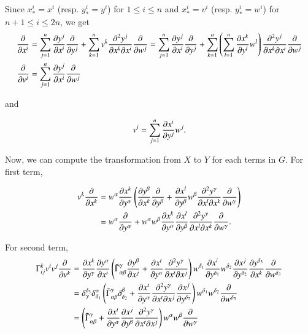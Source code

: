 \documentclass[a4paper, 12pt]{article}
\theoremstyle{Mydefinition}
\theoremstyle{Mytheorem}
\begin{document}
Since $x_*^i = x^i$ (resp. $y_*^i = y^i$) for $1\leq i\leq n$ and $x_*^i = v^i$ (resp. $y_*^i = w^i$) for $n+1\leq i\leq 2n$, we get
\begin{equation*}
\begin{split}
    \pdv{x^i} &= \sum_{j=1}^n \pdv{y^j}{x^i}\pdv{y^j} + \sum_{k=1}^n v^k \frac{\partial^2 y^j}{\partial x^k \partial x^i}\pdv{w^j} = \sum_{j=1}^n \pdv{y^j}{x^i}\pdv{y^j} + \sum_{k=1}^n \left(\sum_{l=1}^n \pdv{x^k}{y^l}w^l\right) \frac{\partial^2 y^j}{\partial x^k \partial x^i}\pdv{w^j}\\
     \pdv{v^i} &= \sum_{j=1}^n \pdv{y^j}{x^i}\pdv{w^j}
\end{split}
\end{equation*}

and

\begin{equation*}
    v^i = \sum_{j=1}^n \pdv{x^i}{y^j} w^j.
\end{equation*}

Now, we can compute the transformation from $X$ to $Y$ for each terms in $G$. For first term,

\begin{equation*}
    \begin{split}
        v^k\pdv{x^k} &= w^\alpha\pdv{x^k}{y^\alpha}\left(\pdv{y^\beta}{x^k}\pdv{y^\beta} + \pdv{x^l}{y^\beta}w^\beta \frac{\partial^2 y^\gamma}{\partial x^l \partial x^k}\pdv{w^\gamma} \right)\\
        &=w^\alpha \pdv{y^\alpha} + w^\alpha w^\beta \pdv{x^k}{y^\alpha}\pdv{x^l}{y^\beta}\frac{\partial^2 y^\gamma}{\partial x^l \partial x^k}\pdv{w^\gamma}.
    \end{split}
\end{equation*}

For second term,
\begin{equation*}
\begin{split}
    \Gamma_{ij}^k v^i v^j\pdv{v^k} &= \pdv{x^k}{y^\gamma}\pdv{y^\alpha}{x^i}\left(\tilde{\Gamma}_{\alpha\beta}^\gamma \pdv{y^\beta}{x^j} + \pdv{x^t}{y^\alpha}\frac{\partial^2 y^\gamma}{\partial x^t \partial x^j}\right)w^{\delta_1}\pdv{x^i}{y^{\delta_1}} w^{\delta_2}\pdv{x^j}{y^{\delta_2}}\pdv{y^{\delta_3}}{x^k}\pdv{w^{\delta_3}}\\
    &=\delta_{\gamma}^{\delta_3}\delta^\alpha_{\delta_1}\left(\tilde{\Gamma}_{\alpha\beta}^{\gamma}\delta_{\delta_2}^{\beta} + \pdv{x^t}{y^\alpha}\frac{\partial^2 y^\gamma}{\partial x^t \partial x^j}\pdv{x^j}{y^{\delta_2}}\right)w^{\delta_1}w^{\delta_2}\pdv{w^{\delta_3}}\\
    &=\left(\tilde{\Gamma}_{\alpha\beta}^\gamma + \pdv{x^t}{y^\alpha}\pdv{x^j}{y^\beta}\frac{\partial^2 y^\gamma}{\partial x^t \partial x^j} \right) w^\alpha w^\beta \pdv{w^\gamma}
\end{split}
\end{equation*}
\end{document}

